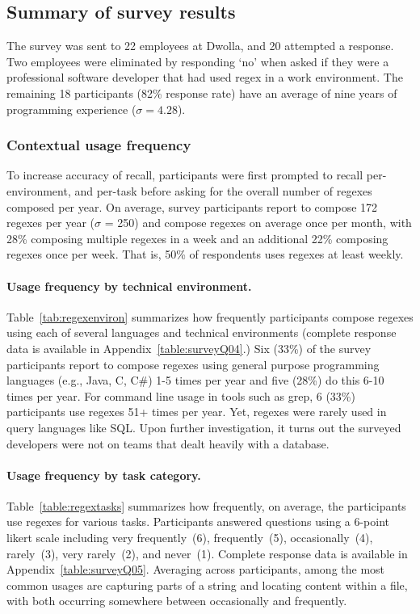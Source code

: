 \subsection{Summary of survey results}
\label{sec:surveyResults}

The survey was sent to 22 employees at Dwolla, and 20 attempted a response.  Two employees were eliminated by responding `no' when asked if they were a professional software developer that had used regex in a work environment.  The remaining 18 participants (82\% response rate) have an average of nine years of programming experience ($\sigma = 4.28$).

\subsubsection{Contextual usage frequency}
\label{sec:compositionFrequency}
To increase accuracy of recall, participants were first prompted to recall per-environment, and per-task before asking for the overall number of regexes composed per year.  On average, survey participants report to compose 172 regexes per year ($\sigma$ = 250) and compose regexes on average once per month, with 28\% composing multiple regexes in a week and an additional 22\% composing regexes once per week. That is, 50\% of respondents uses regexes at least weekly.



\paragraph{Usage frequency by technical environment.} Table~\ref{tab:regexenviron} summarizes how frequently participants compose regexes using each of several languages and technical environments (complete response data is available in Appendix~\ref{table:surveyQ04}.)  Six (33\%) of the survey participants report to compose regexes using general purpose programming languages (e.g., Java, C, C\#) 1-5 times per year and five (28\%) do this 6-10 times per year.  For command line usage in tools such as grep, 6 (33\%) participants use regexes 51+ times per year. Yet, regexes were rarely used in query languages like SQL. Upon further investigation, it turns out the surveyed developers were not on teams that dealt heavily with a database.



\paragraph{Usage frequency by task category.} Table~\ref{table:regextasks} summarizes how frequently, on average, the participants use
regexes for various tasks.
Participants answered questions using a 6-point likert scale including very frequently~(6), frequently~(5), occasionally~(4), rarely~(3), very rarely~(2), and never~(1).  Complete response data is available in Appendix~\ref{table:surveyQ05}.  Averaging across participants, among the most common usages are capturing parts of a string and locating content within a file, with both occurring somewhere between occasionally and frequently.

